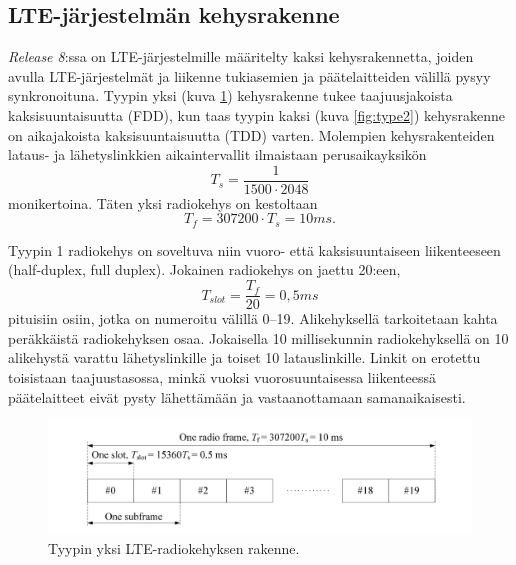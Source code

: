 \documentclass[finnish,12pt,a4paper,pdftex]{article}
\begin{document}


\subsection{LTE-järjestelmän kehysrakenne}

\textit{Release 8}:ssa on LTE-järjestelmille määritelty kaksi kehysrakennetta, joiden avulla LTE-järjestelmät ja liikenne tukiasemien ja päätelaitteiden välillä pysyy synkronoituna. Tyypin yksi (kuva \ref{fig:type1}) kehysrakenne tukee taajuusjakoista kaksisuuntaisuutta (FDD), kun taas tyypin kaksi (kuva \ref{fig:type2}) kehysrakenne on aikajakoista kaksisuuntaisuutta (TDD) varten. Molempien kehysrakenteiden lataus- ja lähetyslinkkien aikaintervallit ilmaistaan perusaikayksikön \begin{equation}
    T_s = \frac{1}{1500 \cdot 2048}
\end{equation}
monikertoina. Täten yksi radiokehys on kestoltaan
\begin{equation}
    T_f = 307200 \cdot T_s = 10 ms.
\end{equation}\cite{ETSIts36211}

Tyypin 1 radiokehys on soveltuva niin vuoro- että kaksisuuntaiseen liikenteeseen (half-duplex, full duplex). Jokainen radiokehys on jaettu 20:een, \begin{equation}
    T_{slot} = \frac{T_f}{20} = 0,5 ms
\end{equation}
pituisiin osiin, jotka on numeroitu välillä 0--19. Alikehyksellä tarkoitetaan kahta peräkkäistä radiokehyksen osaa. Jokaisella 10 millisekunnin radiokehyksellä on 10 alikehystä varattu lähetyslinkille ja toiset 10 latauslinkille. Linkit on erotettu toisistaan taajuustasossa, minkä vuoksi vuorosuuntaisessa liikenteessä päätelaitteet eivät pysty lähettämään ja vastaanottamaan samanaikaisesti. \cite{ETSIts36211}
~\begin{figure}[h!]
    \centering
    \includegraphics[width=\linewidth]{Images/radioframe1.png}
    \caption{Tyypin yksi LTE-radiokehyksen rakenne. \cite{ETSIts36211}}
    \label{fig:type1}
\end{figure}
\end{document}
